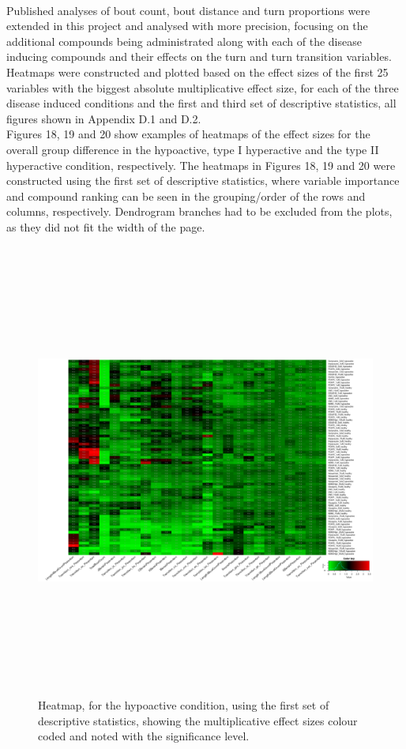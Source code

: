 \documentclass[a4paper,12pt]{article}
\begin{document}
\\Published analyses of bout count, bout distance and turn proportions\cite{ref18} were extended in this project and analysed with more precision, focusing on the additional compounds being administrated along with each of the disease inducing compounds and their effects on the turn and turn transition variables.
\\Heatmaps were constructed and plotted based on the effect sizes of the first 25 variables with the biggest absolute multiplicative effect size, for each of the three disease induced conditions and the first and third set of descriptive statistics, all figures shown in Appendix D.1 and D.2.\\Figures 18, 19 and 20 show examples of heatmaps of the effect sizes for the overall group difference in the hypoactive, type I hyperactive and the type II hyperactive condition, respectively. The heatmaps in Figures 18, 19 and 20 were constructed using the first set of descriptive statistics, where variable importance and compound ranking can be seen in the grouping/order of the rows and columns, respectively. Dendrogram branches had to be excluded from the plots, as they did not fit the width of the page.
\newpage
\begin{figure}[h!]
\begin{center}
\includegraphics[width=16cm,height=15cm]{DarkApoLow_heatmap_all_DarkApoLow_B2MAP.png}
\caption{Heatmap, for the hypoactive condition, using the first set of descriptive statistics, showing the multiplicative effect sizes colour coded and noted with the significance level.}
\end{center}
\end{figure}
\end{document}
